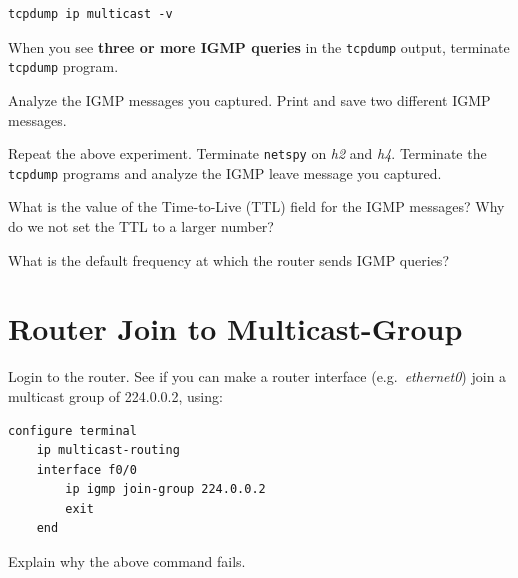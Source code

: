 \documentclass{../UTNetLab}
\begin{document}
\begin{lstlisting}[emph={eth0}]
tcpdump ip multicast -v
    \end{lstlisting}
When you see \textbf{three or more IGMP queries} in the \lstinline{tcpdump} output, terminate \lstinline{tcpdump} program.

Analyze the IGMP messages you captured.
Print and save two different IGMP messages.

Repeat the above experiment.
Terminate \lstinline{netspy} on \textit{h2} and \textit{h4}.
Terminate the \lstinline{tcpdump} programs and analyze the IGMP leave message you captured.

\begin{report}
    \item What is the value of the Time-to-Live (TTL) field for the IGMP messages?
    Why do we not set the TTL to a larger number?

    \item What is the default frequency at which the router sends IGMP queries?
\end{report}

\section{Router Join to Multicast-Group}
Login to the router.
See if you can make a router interface (e.g.\ \textit{ethernet0}) join a multicast group of 224.0.0.2, using:

\begin{lstlisting}[language={cisco}]
configure terminal
    ip multicast-routing
    interface f0/0
        ip igmp join-group 224.0.0.2
        exit
    end
    \end{lstlisting}

\begin{report}
    \item Explain why the above command fails.
\end{report}
\end{document}
